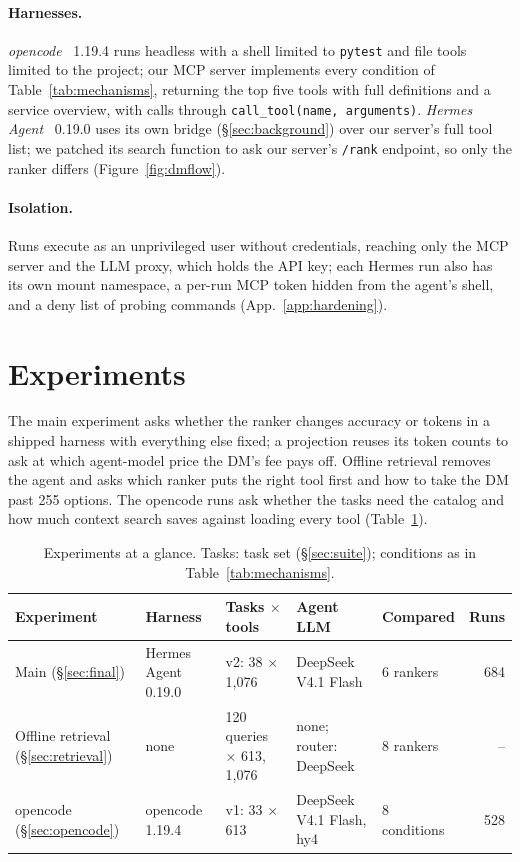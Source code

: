 \documentclass[11pt]{article}
\begin{document}
\paragraph{Harnesses.} \emph{opencode}~\citep{opencode} 1.19.4 runs headless with a shell limited to
\texttt{pytest} and file tools limited to the project; our MCP server implements every condition of
Table~\ref{tab:mechanisms}, returning the top five tools with full definitions and a service overview, with calls
through \texttt{call\_tool(name, arguments)}. \emph{Hermes Agent}~\citep{hermesagent} 0.19.0 uses its own bridge
(\S\ref{sec:background}) over our server's full tool list; we patched its search function to ask our server's
\texttt{/rank} endpoint, so only the ranker differs (Figure~\ref{fig:dmflow}).

\paragraph{Isolation.} Runs execute as an unprivileged user without credentials, reaching only the MCP server and
the LLM proxy, which holds the API key; each Hermes run also has its own mount namespace, a per-run MCP token
hidden from the agent's shell, and a deny list of probing commands (App.~\ref{app:hardening}).

\section{Experiments}\label{sec:experiments}
The main experiment asks whether the ranker changes accuracy or tokens in a shipped harness with everything else
fixed; a projection reuses its token counts to ask at which agent-model price the DM's fee pays off. Offline
retrieval removes the agent and asks which ranker puts the right tool first and how to take the DM past 255
options. The opencode runs ask whether the tasks need the catalog and how much context search saves against
loading every tool (Table~\ref{tab:overview}).

\begin{table}[t]
\centering\footnotesize
\caption{Experiments at a glance. Tasks: task set (\S\ref{sec:suite}); conditions as in
Table~\ref{tab:mechanisms}.}
\label{tab:overview}
\setlength{\tabcolsep}{4pt}
\begin{tabularx}{\linewidth}{@{}lll>{\raggedright\arraybackslash}Xlr@{}}
\toprule
Experiment & Harness & Tasks $\times$ tools & Agent LLM & Compared & Runs \\
\midrule
Main (\S\ref{sec:final}) & Hermes Agent 0.19.0 & v2: 38 $\times$ 1{,}076 & DeepSeek V4.1 Flash & 6 rankers & 684 \\
Offline retrieval (\S\ref{sec:retrieval}) & none & 120 queries $\times$ 613, 1{,}076 & none; router: DeepSeek & 8 rankers & -- \\
opencode (\S\ref{sec:opencode}) & opencode 1.19.4 & v1: 33 $\times$ 613 & DeepSeek V4.1 Flash, hy4 & 8 conditions & 528 \\
\bottomrule
\end{tabularx}
\end{table}
\end{document}
